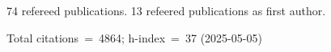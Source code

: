 74 refereed publications. 13 refeered publications as first author.

Total citations~=~4864; h-index~=~37 (2025-05-05)